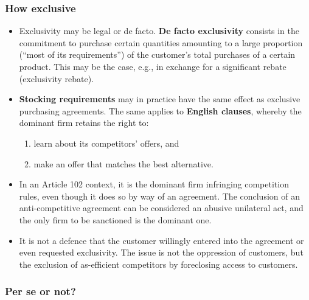         \subsubsection{How exclusive}

            \begin{itemize}
                \item Exclusivity may be legal or de facto. \textbf{De facto exclusivity} consists in the commitment to purchase certain quantities amounting to a large proportion (“most of its requirements”) of the customer’s total purchases of a certain product. This may be the case, e.g., in exchange for a significant rebate (exclusivity rebate).
                \item \textbf{Stocking requirements} may in practice have the same effect as exclusive purchasing agreements. The same applies to \textbf{English clauses}, whereby the dominant firm retains the right to: 
                \begin{enumerate}
                    \item learn about its competitors’ offers, and
                    \item make an offer that matches the best alternative.
                \end{enumerate}
                \item In an Article 102 context, it is the dominant firm infringing competition rules, even though it does so by way of an agreement. The conclusion of an anti-competitive agreement can be considered an abusive unilateral act, and the only firm to be sanctioned is the dominant one.
                \item It is not a defence that the customer willingly entered into the agreement or even requested exclusivity. The issue is not the oppression of customers, but the exclusion of as-efficient competitors by foreclosing access to customers.
            \end{itemize}

        \subsubsection{Per se or not?}

